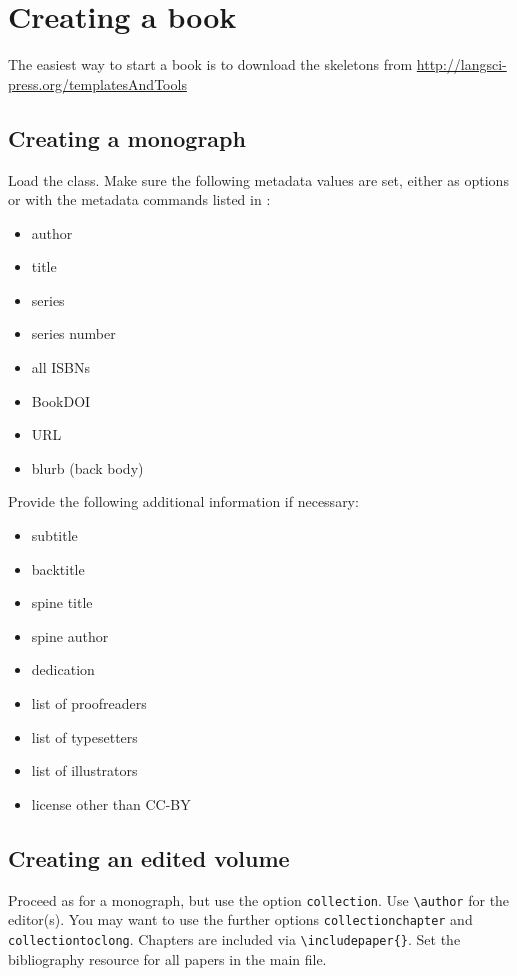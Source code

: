 \documentclass[modfonts,output=guidelines]{langscibook}
\begin{document}
\chapter{Creating a book}
The easiest way to start a book is to download the skeletons from \url{http://langsci-press.org/templatesAndTools}

\section{Creating a monograph}
Load the class. Make sure the following metadata values are set, either as options or with the metadata commands listed in :

\begin{itemize}
 \item author 
 \item title
 \item series 
 \item series number
 \item all ISBNs
 \item BookDOI
 \item URL
 \item blurb (back body)
\end{itemize}

Provide the following additional information if necessary:
\begin{itemize}
 \item subtitle
 \item backtitle
 \item spine title 
 \item spine author
 \item dedication 
 \item list of proofreaders 
 \item list of typesetters
 \item list of illustrators 
 \item license other than CC-BY
\end{itemize}

 
\section{Creating an edited volume}
Proceed as for a monograph, but use the option \texttt{collection}. Use \verb+\author+ for the editor(s). You may want to use the further options \texttt{collectionchapter} and \texttt{collectiontoclong}. Chapters are included via \verb+\includepaper{}+. Set the bibliography resource for all papers in the main file. 
\end{document}
